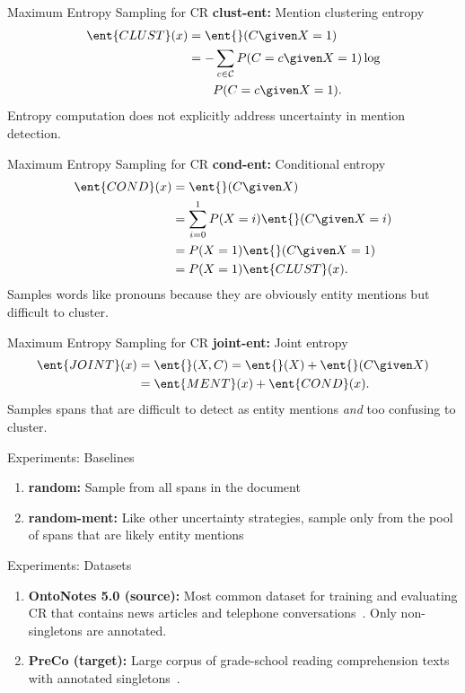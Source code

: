 \begin{frame}{Maximum Entropy Sampling for CR}
\textbf{clust-ent:} Mention clustering entropy
\begin{align}
    \ent{CLUST}(x)
        &= \ent{}(C \given X = 1) \\
        &= -\sum_{c \in \mathcal{C}} P(C = c \given X =
    1) \log \nonumber \\
    & \qquad P(C = c \given X = 1). \nonumber
\end{align}
Entropy computation does not explicitly address uncertainty in mention
detection.
\end{frame}

\begin{frame}{Maximum Entropy Sampling for CR}
\textbf{cond-ent:} Conditional entropy
\begin{equation}
\begin{split}
    \ent{COND}(x)
        &= \ent{}(C \given X) \\
        &= \sum_{i=0}^1 P(X=i) \ent{}(C \given X = i) \\
        &= P(X=1) \ent{}(C \given X=1) \\
        &= P(X=1) \ent{CLUST}(x).
\end{split}
\end{equation}
Samples words like pronouns because they are obviously entity mentions but
difficult to cluster.
\end{frame}


\begin{frame}{Maximum Entropy Sampling for CR}
\textbf{joint-ent:} Joint entropy
\begin{align}
    \ent{JOINT}(x)
        &= \ent{}(X,C) = \ent{}(X) + \ent{}(C \given X) \nonumber \\
        &= \ent{MENT}(x) + \ent{COND}(x).
\end{align}
Samples spans that are difficult to detect as entity mentions \emph{and}
too confusing to cluster.
\end{frame}

\begin{frame}{Experiments: Baselines}
\begin{enumerate}
\item \textbf{random:} Sample from all spans in the document
\item \textbf{random-ment:} Like other uncertainty strategies, sample only from
the pool of spans that are likely entity mentions
\end{enumerate}
\end{frame}
\begin{frame}{Experiments: Datasets}
    \begin{enumerate}
        \item \textbf{OntoNotes 5.0 (source):} Most common dataset for training and evaluating
        CR that contains news articles and telephone
            conversations~\citep{pradhan-2013}. Only non-singletons are
            annotated.
        \item \textbf{PreCo (target):} Large corpus of grade-school reading comprehension
        texts with annotated singletons~\citep{chen-2018}.
    \end{enumerate}
\end{frame}

